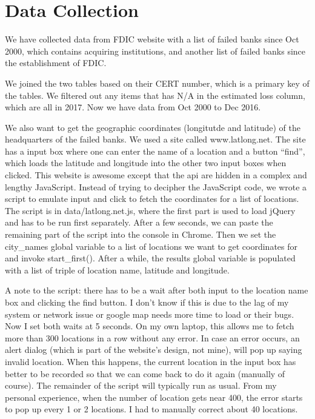 \section{Data Collection}

We have collected data from FDIC website with a list of failed banks since Oct
2000, which contains acquiring institutions, and another list of failed banks
since the establishment of FDIC.

We joined the two tables based on their CERT number, which is a primary key of
the tables. We filtered out any items that has N/A in the estimated loss
column, which are all in 2017. Now we have data from Oct 2000 to Dec 2016.

We also want to get the geographic coordinates (longitutde and latitude) of
the headquarters of the failed banks. We used a site called www.latlong.net.
The site has a input box where one can enter the name of a location and a
button ``find'', which loads the latitude and longitude into the other two
input boxes when clicked. This website is awesome except that the api are
hidden in a complex and lengthy JavaScript. Instead of trying to decipher the
JavaScript code, we wrote a script to emulate input and click to fetch the
coordinates for a list of locations. The script is in data/latlong.net.js,
where the first part is used to load jQuery and has to be run first
separately. After a few seconds, we can paste the remaining part of the script
into the console in Chrome. Then we set the city\_names global variable to a
list of locations we want to get coordinates for and invoke start\_first().
After a while, the results global variable is populated with a list of triple
of location name, latitude and longitude.

A note to the script: there has to be a wait after both input to the location
name box and clicking the find button. I don't know if this is due to the lag
of my system or network issue or google map needs more time to load or their
bugs. Now I set both waits at 5 seconds. On my own laptop, this allows me to
fetch more than 300 locations in a row without any error. In case an error
occurs, an alert dialog (which is part of the website's design, not mine),
will pop up saying invalid location. When this happens, the current location
in the input box has better to be recorded so that we can come back to do it
again (manually of course). The remainder of the script will typically run as
usual. From my personal experience, when the number of location gets near 400,
the error starts to pop up every 1 or 2 locations. I had to manually correct
about 40 locations.

